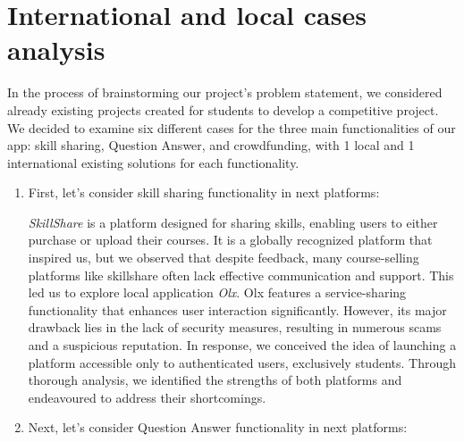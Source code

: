 \newpage
\section{International and local cases analysis} \label{intandloc}

\hspace*{1cm} In the process of brainstorming our project's problem statement, we considered already existing projects created for students to develop a competitive project. We decided to examine six different cases for the three main functionalities of our app: skill sharing, Question Answer, and crowdfunding, with 1 local and 1 international existing solutions for each functionality.

\begin{enumerate}
    \item First, let’s consider skill sharing functionality in next platforms:

     \textit{SkillShare} is a platform designed for sharing skills, enabling users to either purchase or upload their courses. It is a globally recognized platform that inspired us, but we observed that despite feedback, many course-selling platforms like skillshare often lack effective communication and support. This led us to explore local application \textit{Olx}. Olx \cite{olx} features a service-sharing functionality that enhances user interaction significantly. However, its major drawback lies in the lack of security measures, resulting in numerous scams and a suspicious reputation. In response, we conceived the idea of launching a platform accessible only to authenticated users, exclusively students. Through thorough analysis, we identified the strengths of both platforms and endeavoured to address their shortcomings.

     \item Next, let’s consider Question Answer functionality in next platforms:


\end{enumerate}
